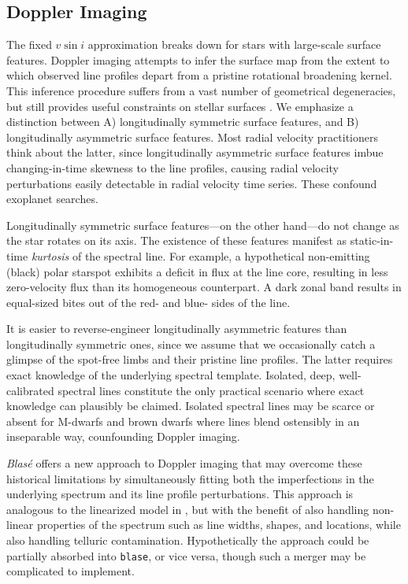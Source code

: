 \documentclass[trackchanges]{aastex631}
\begin{document}
\subsection{Doppler Imaging}
The fixed $v\sin{i}$ approximation breaks down for stars with large-scale surface features.  Doppler imaging attempts to infer the surface map from the extent to which observed line profiles depart from a pristine rotational broadening kernel.  This inference procedure suffers from a vast number of geometrical degeneracies, but still provides useful constraints on stellar surfaces \citep{2021arXiv211006271L}.  We emphasize a distinction between A) longitudinally symmetric surface features, and B) longitudinally asymmetric surface features.  Most radial velocity practitioners think about the latter, since longitudinally asymmetric surface features imbue changing-in-time skewness to the line profiles, causing radial velocity perturbations easily detectable in radial velocity time series.  These confound exoplanet searches.

Longitudinally symmetric surface features---on the other hand---do not change as the star rotates on its axis.  The existence of these features manifest as static-in-time \emph{kurtosis} of the spectral line.  For example, a hypothetical non-emitting (black) polar starspot exhibits a deficit in flux at the line core, resulting in less zero-velocity flux than its homogeneous counterpart.  A dark zonal band results in equal-sized bites out of the red- and blue- sides of the line.

It is easier to reverse-engineer longitudinally asymmetric features than longitudinally symmetric ones, since we assume that we occasionally catch a glimpse of the spot-free limbs and their pristine line profiles.
The latter requires exact knowledge of the underlying spectral template.  Isolated, deep, well-calibrated spectral lines constitute the only practical scenario where exact knowledge can plausibly be claimed.  Isolated spectral lines may be scarce or absent for M-dwarfs and brown dwarfs where lines blend ostensibly in an inseparable way, counfounding Doppler imaging.

\emph{Blas\'e} offers a new approach to Doppler imaging that may overcome these historical limitations by simultaneously fitting both the imperfections in the underlying spectrum and its line profile perturbations.  This approach is analogous to the linearized model in \citet{2021arXiv211006271L}, but with the benefit of also handling non-linear properties of the spectrum such as line widths, shapes, and locations, while also handling telluric contamination.  Hypothetically the \citet{2021arXiv211006271L} approach could be partially absorbed into \texttt{blase}, or vice versa, though such a merger may be complicated to implement.
\end{document}
